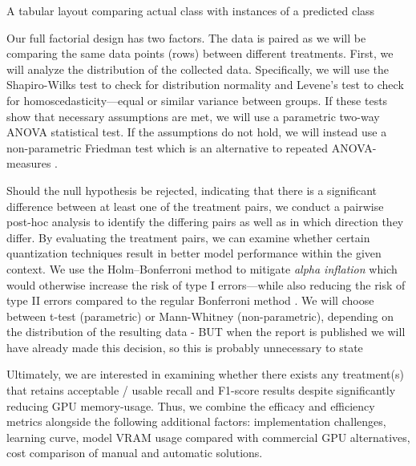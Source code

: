 \documentclass[conference]{IEEEtran}
\begin{document}
A tabular layout comparing actual class with instances of a predicted class 

Our full factorial design has two factors. The data is paired as we will be comparing the same data points (rows) between different treatments. First, we will analyze the distribution of the collected data. Specifically, we will use the Shapiro-Wilks test to check for distribution normality and Levene's test to check for homoscedasticity---equal or similar variance between groups. If these tests show that necessary assumptions are met, we will use a parametric two-way ANOVA statistical test. If the assumptions do not hold, we will instead use a non-parametric Friedman test which is an alternative to repeated ANOVA-measures \cite{mccrum2008statisticalTests}.

Should the null hypothesis be rejected, indicating that there is a significant difference between at least one of the treatment pairs, we conduct a pairwise post-hoc analysis to identify the differing pairs as well as in which direction they differ. By evaluating the treatment pairs, we can examine whether certain quantization techniques result in better model performance within the given context. 
We use the Holm–Bonferroni method to mitigate \textit{alpha inflation} which would otherwise increase the risk of type I errors---while also reducing the risk of type II errors compared to the regular Bonferroni method \cite{abdi2010HolmBonferroni}.
We will choose between t-test (parametric) or Mann-Whitney (non-parametric), depending on the distribution of the resulting data - BUT when the report is published we will have already made this decision, so this is probably unnecessary to state

Ultimately, we are interested in examining whether there exists any treatment(s) that retains acceptable / usable recall and F1-score results despite significantly reducing GPU memory-usage. Thus, we combine the efficacy and efficiency metrics alongside the following additional factors: implementation challenges, learning curve, model VRAM usage compared with commercial GPU alternatives, cost comparison of manual and automatic solutions. 
\end{document}
